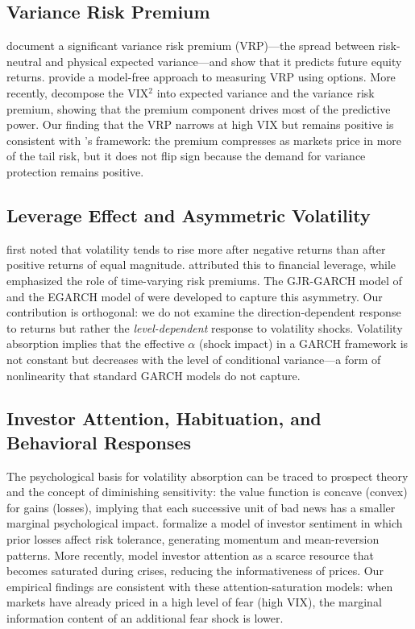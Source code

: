 \documentclass[12pt,a4paper]{article}
\begin{document}
\subsection{Variance Risk Premium}

\citet{bollerslev2009} document a significant variance risk premium (VRP)---the spread between risk-neutral and physical expected variance---and show that it predicts future equity returns. \citet{carr2009} provide a model-free approach to measuring VRP using options. More recently, \citet{bekaert2014} decompose the VIX$^2$ into expected variance and the variance risk premium, showing that the premium component drives most of the predictive power. Our finding that the VRP narrows at high VIX but remains positive is consistent with \citet{bollerslev2009}'s framework: the premium compresses as markets price in more of the tail risk, but it does not flip sign because the demand for variance protection remains positive.

\subsection{Leverage Effect and Asymmetric Volatility}

\citet{black1976} first noted that volatility tends to rise more after negative returns than after positive returns of equal magnitude. \citet{christie1982} attributed this to financial leverage, while \citet{bekaert2000} emphasized the role of time-varying risk premiums. The GJR-GARCH model of \citet{glosten1993} and the EGARCH model of \citet{nelson1991} were developed to capture this asymmetry. Our contribution is orthogonal: we do not examine the direction-dependent response to returns but rather the \textit{level-dependent} response to volatility shocks. Volatility absorption implies that the effective $\alpha$ (shock impact) in a GARCH framework is not constant but decreases with the level of conditional variance---a form of nonlinearity that standard GARCH models do not capture.

\subsection{Investor Attention, Habituation, and Behavioral Responses}

The psychological basis for volatility absorption can be traced to prospect theory \citep{kahneman1979} and the concept of diminishing sensitivity: the value function is concave (convex) for gains (losses), implying that each successive unit of bad news has a smaller marginal psychological impact. \citet{barberis2001} formalize a model of investor sentiment in which prior losses affect risk tolerance, generating momentum and mean-reversion patterns. More recently, \citet{andrei2015} model investor attention as a scarce resource that becomes saturated during crises, reducing the informativeness of prices. Our empirical findings are consistent with these attention-saturation models: when markets have already priced in a high level of fear (high VIX), the marginal information content of an additional fear shock is lower.
\end{document}
